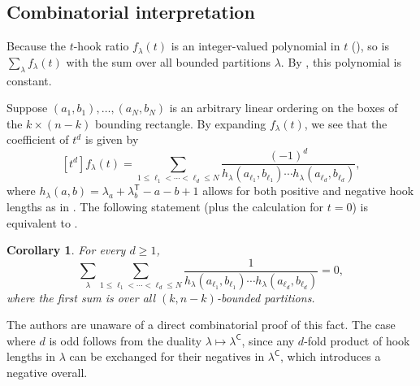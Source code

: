 \documentclass{amsart}
\newcommand\C{\mathsf{C}}
\newcommand\T{\mathsf{T}}
\theoremstyle{plain}
\newtheorem{corollary}[corollary]{Corollary}
\theoremstyle{definition}
\numberwithin{equation}{section}
\begin{document}
\subsection{Combinatorial interpretation}

Because the $t$-hook ratio $f_\lambda(t)$ is an integer-valued polynomial in $t$ (), so is $\sum_\lambda f_\lambda(t)$ with the sum over all bounded partitions $\lambda$. By , this polynomial is constant.

Suppose $(a_1,b_1),\dots,(a_N,b_N)$ is an arbitrary linear ordering on the boxes of the $k\times(n-k)$ bounding rectangle. By expanding $f_\lambda(t)$, we see that the coefficient of $t^d$ is given by
\[[t^d]f_\lambda(t)=\sum_{1\leq\ell_1<\cdots<\ell_d\leq N}\frac{(-1)^d}{h_\lambda(a_{\ell_1},b_{\ell_1})\cdots h_\lambda(a_{\ell_d},b_{\ell_d})},\]
where $h_\lambda(a,b)=\lambda_a+\lambda_b^\T-a-b+1$ allows for both positive and negative hook lengths as in . The following statement (plus the calculation for $t=0$) is equivalent to .

\begin{corollary}
For every $d\geq 1$,
\[\sum_\lambda\sum_{1\leq\ell_1<\cdots<\ell_d\leq N}\frac{1}{h_\lambda(a_{\ell_1},b_{\ell_1})\cdots h_\lambda(a_{\ell_d},b_{\ell_d})}=0,\]
where the first sum is over all $(k,n-k)$-bounded partitions.
\end{corollary}

The authors are unaware of a direct combinatorial proof of this fact. The case where $d$ is odd follows from the duality $\lambda\mapsto\lambda^\C$, since any $d$-fold product of hook lengths in $\lambda$ can be exchanged for their negatives in $\lambda^\C$, which introduces a negative overall.
\end{document}
